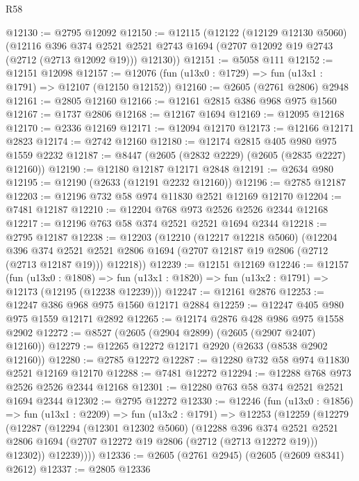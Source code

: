 \begin{lexlean}{R58}
\begin{coremodule}
@12130 := @2795 @12092
@12150 := @12115
    (@12122
      (@12129 @12130 @5060)
      (@12116
        @396
        @374
        @2521
        @2521
        @2743
        @1694
        (@2707 @12092 @19 @2743 (@2712 (@2713 @12092 @19)))
        @12130))
@12151 := @5058 @111
@12152 := @12151 @12098
@12157 := @12076 (fun (u13x0 : @1729) => fun (u13x1 : @1791) => @12107 (@12150 @12152))
@12160 := @2605 (@2761 @2806) @2948
@12161 := @2805 @12160
@12166 := @12161 @2815 @386 @968 @975 @1560
@12167 := @1737 @2806
@12168 := @12167 @1694
@12169 := @12095 @12168
@12170 := @2336 @12169
@12171 := @12094 @12170
@12173 := @12166 @12171 @2823
@12174 := @2742 @12160
@12180 := @12174 @2815 @405 @980 @975 @1559 @2232
@12187 := @8447 (@2605 (@2832 @2229) (@2605 (@2835 @2227) @12160))
@12190 := @12180 @12187 @12171 @2848
@12191 := @2634 @980
@12195 := @12190 (@2633 (@12191 @2232 @12160))
@12196 := @2785 @12187
@12203 := @12196 @732 @58 @974 @11830 @2521 @12169 @12170
@12204 := @7481 @12187
@12210 := @12204 @768 @973 @2526 @2526 @2344 @12168
@12217 := @12196 @763 @58 @374 @2521 @2521 @1694 @2344
@12218 := @2795 @12187
@12238 := @12203
    (@12210
      (@12217 @12218 @5060)
      (@12204
        @396
        @374
        @2521
        @2521
        @2806
        @1694
        (@2707 @12187 @19 @2806 (@2712 (@2713 @12187 @19)))
        @12218))
@12239 := @12151 @12169
@12246 := @12157
    (fun (u13x0 : @1808) =>
    fun (u13x1 : @1820) => fun (u13x2 : @1791) => @12173 (@12195 (@12238 @12239)))
@12247 := @12161 @2876
@12253 := @12247 @386 @968 @975 @1560 @12171 @2884
@12259 := @12247 @405 @980 @975 @1559 @12171 @2892
@12265 := @12174 @2876 @428 @986 @975 @1558 @2902
@12272 := @8527 (@2605 (@2904 @2899) (@2605 (@2907 @2407) @12160))
@12279 := @12265 @12272 @12171 @2920 (@2633 (@8538 @2902 @12160))
@12280 := @2785 @12272
@12287 := @12280 @732 @58 @974 @11830 @2521 @12169 @12170
@12288 := @7481 @12272
@12294 := @12288 @768 @973 @2526 @2526 @2344 @12168
@12301 := @12280 @763 @58 @374 @2521 @2521 @1694 @2344
@12302 := @2795 @12272
@12330 := @12246
    (fun (u13x0 : @1856) =>
    fun (u13x1 : @2209) =>
    fun (u13x2 : @1791) =>
    @12253
      (@12259
        (@12279
          (@12287
            (@12294
              (@12301 @12302 @5060)
              (@12288
                @396
                @374
                @2521
                @2521
                @2806
                @1694
                (@2707 @12272 @19 @2806 (@2712 (@2713 @12272 @19)))
                @12302))
            @12239))))
@12336 := @2605 (@2761 @2945) (@2605 (@2609 @8341) @2612)
@12337 := @2805 @12336

\end{coremodule}
\end{lexlean}
